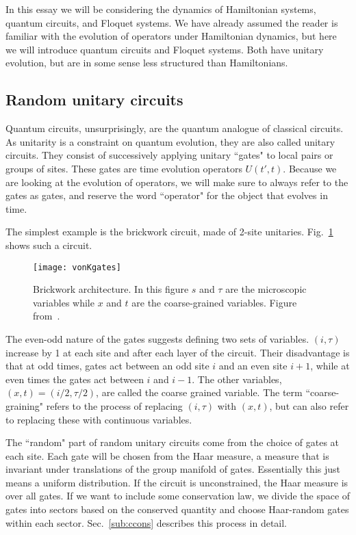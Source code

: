 \documentclass[a4paper,11pt]{article}
\renewcommand{\t}{\tau}
\begin{document}
In this essay we will be considering the dynamics of Hamiltonian systems, quantum circuits, and Floquet systems. We have already assumed the reader is familiar with the evolution of operators under Hamiltonian dynamics, but here we will introduce quantum circuits and Floquet systems. Both have unitary evolution, but are in some sense less structured than Hamiltonians.

\subsection{Random unitary circuits} \label{sub:ruc}

Quantum circuits, unsurprisingly, are the quantum analogue of classical circuits. As unitarity is a constraint on quantum evolution, they are also called unitary circuits. They consist of successively applying unitary ``gates" to local pairs or groups of sites. These gates are time evolution operators $U(t',t)$. Because we are looking at the evolution of operators, we will make sure to always refer to the gates as gates, and reserve the word ``operator" for the object that evolves in time.

The simplest example is the brickwork circuit, made of 2-site unitaries. Fig.~\ref{fig:vonKgates} shows such a circuit.
\begin{figure}
	\centering
	\texttt{[image: vonKgates]}
	\caption{Brickwork architecture. In this figure $s$ and $\tau$ are the microscopic variables while $x$ and $t$ are the coarse-grained variables. Figure from~\cite{vonKeyserlingkHydro}.}
	\label{fig:vonKgates}
\end{figure}
The even-odd nature of the gates suggests defining two sets of variables. $(i,\t)$ increase by 1 at each site and after each layer of the circuit. 
Their disadvantage is that at odd times, gates act between an odd site $i$ and an even site $i+1$, while at even times the gates act between $i$ and $i-1$.
The other variables, $(x,t) = (i/2,\t/2)$, are called the coarse grained variable.
The term ``coarse-graining" refers to the process of replacing $(i,\t)$ with $(x,t)$, but can also refer to replacing these with continuous variables.

The ``random" part of random unitary circuits come from the choice of gates at each site. Each gate will be chosen from the Haar measure, a measure that is invariant under translations of the group manifold of gates. Essentially this just means a uniform distribution. If the circuit is unconstrained, the Haar measure is over all gates. If we want to include some conservation law, we divide the space of gates into sectors based on the conserved quantity and choose Haar-random gates within each sector. Sec.~\ref{sub:ccons} describes this process in detail.
\end{document}
